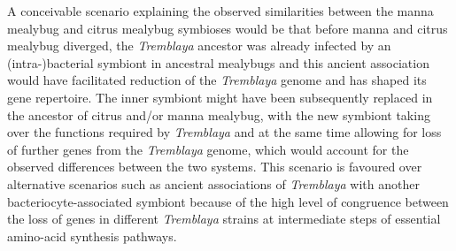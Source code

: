 \documentclass[11pt]{article}
\begin{document}
\begin{sloppypar}
\newline

A conceivable scenario explaining the observed similarities between the manna mealybug and citrus mealybug symbioses would be that before manna and citrus mealybug diverged, the \textit{Tremblaya} ancestor was already infected by an (intra-)bacterial symbiont in ancestral mealybugs and this ancient association would have facilitated reduction of the \textit{Tremblaya} genome and has shaped its gene repertoire. 
The inner symbiont might have been subsequently replaced in the ancestor of citrus and/or manna mealybug, with the new symbiont taking over the functions required by \textit{Tremblaya} and at the same time allowing for loss of further genes from the \textit{Tremblaya} genome, which would account for the observed differences between the two systems.
This scenario is favoured over alternative scenarios such as ancient associations of \textit{Tremblaya} with another bacteriocyte-associated symbiont because of the high level of congruence between the loss of genes in different \textit{Tremblaya} strains at intermediate steps of essential amino-acid synthesis pathways. 

\end{sloppypar}
\end{document}
